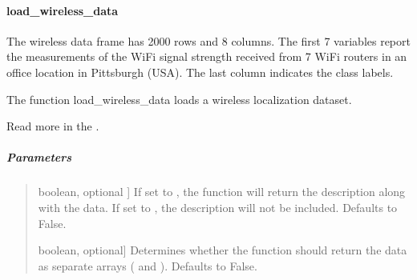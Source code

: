 \documentclass[letterpaper,10pt,english,openany,oneside]{sphinxmanual}
\begin{document}
\sphinxstepscope


\paragraph{load\_wireless\_data}
\label{\detokenize{api_reference/generated/QuadratiK.datasets.load_wireless_data:load-wireless-data}}\label{\detokenize{api_reference/generated/QuadratiK.datasets.load_wireless_data::doc}}

\begin{fulllineitems}
\label{\detokenize{api_reference/generated/QuadratiK.datasets.load_wireless_data:QuadratiK.datasets.load_wireless_data}}
\pysigstartsignatures
{}
\pysigstopsignatures
\sphinxAtStartPar
The wireless data frame has 2000 rows and 8 columns. The first 7 variables
report the measurements of the Wi\sphinxhyphen{}Fi signal strength received from 7 Wi\sphinxhyphen{}Fi routers in an
office location in Pittsburgh (USA). The last column indicates the class labels.

\sphinxAtStartPar
The function load\_wireless\_data loads a wireless localization dataset.

\sphinxAtStartPar
Read more in the {\hyperref[\detokenize{user_guide/datasets:datasets}]{}}.


\subparagraph{Parameters}
\label{\detokenize{api_reference/generated/QuadratiK.datasets.load_wireless_data:parameters}}\begin{quote}
\begin{description}
\sphinxlineitem{desc}{[}boolean, optional {]}
\sphinxAtStartPar
If set to , the function will return the description along with the data. 
If set to , the description will not be included. Defaults to False.

\sphinxlineitem{return\_X\_y}{[}boolean, optional{]}
\sphinxAtStartPar
Determines whether the function should return the data as separate arrays ( and ). 
Defaults to False.


\end{description}
\end{quote}
\end{fulllineitems}
\end{document}
